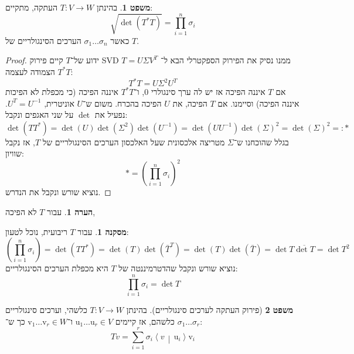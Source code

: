 \documentclass[a4paper]{article}
\newcommand\vrm   {\bm{\mathrm{v}}}
\newcommand\urm   {\bm{\mathrm{u}}}
\newcommand\ra    {\rangle}
\newcommand\la    {\langle}
\newcommand\co        {\colon}
\newcommand\mut [2]   {\left \la #1 \,\middle|\, #2 \right \ra}
\newcommand\sg        {\sigma}
\newcommand\Sg        {\Sigma}
\newcommand\op    {^{-1}}
\newcommand\cl [1]    {\left ( #1 \right )}
\theoremstyle{definition}
\newtheorem{Theorem}{\color{myblue}משפט}
\newtheorem{Remark}{\color{mycyan}הערה}
\newtheorem{Collary}{\color{mymagenta}מסקנה}
\newcommand\cola [1] {\begin{Collary}#1\end{Collary}}
\newcommand\theo  [1] {\begin{Theorem}#1\end{Theorem}}
\newcommand\rmark [1] {\begin{Remark}#1\end{Remark}}
\begin{document}
	\theo{בהינתן $T \co V \to W$ העתקה, מתקיים: 
	\[ \sqrt{\det(T^*T)} = \prod_{i = 1}^{n}\sg_i \]
	כאשר $\sg_1 \dots \sg_n$ הערכים הסינגולריים של $T$. 
	}
	\begin{proof}
		ידוע של־$T$ קיים פירוק SVD $T = U\Sg V^T$ ממנו נסיק את הפירוק הספקטרלי הבא ל־$T^*T$ הצמודה לעצמה:
		\[ T^*T = U\Sg^2U^T \]
		אם $T$ איננה הפיכה אז יש לה ערך סינגולרי $0$, ו־$T^*T$ איננה הפיכה (כי מכפלת לא הפיכות איננה הפיכה) וסיימנו. 
		אם $T$ הפיכה, את $U$ הפיכה בהכרח. משום ש־$U$ אוניטרית, $U^T = U\op$. נפעיל את $\det$ על שני האגפים ונקבל: 
		\[ \det(TT^*) = \det(U)\det(\Sg^2)\det(U\op) = \det(UU\op)\det(\Sg)^{2} = \det(\Sg)^2 =: * \]
		בגלל שהוכחנו ש־$\Sg$ מטריצה אלכסונית שעל האלכסון הערכים הסינגולריים של $T$, אז נקבל שוויון: 
		\[ * = \cl{\prod_{i = 1}^{n}\sg_i}^{2} \]
		נוציא שורש ונקבל את הנדרש. 
	\end{proof}
	\rmark{עבור $T$ לא הפיכה, }
	\cola{עבור $T$ ריבועית, נוכל לטעון: 
	\[ \cl{\prod_{i = 1}^{n}\sg_i} = \det(TT^*) = \det(T)\det(\bar T^T) = \det(T) \det (\bar T) = \det T \overline{\det T} = \det T^2 \]
	נוציא שורש ונקבל שהדטרמיננטה של $T$ היא מכפלת הערכים הסינגולריים: 
	\[ \prod_{i = 1}^{n} \sg_i = \det T \]}
	
	
	\begin{Theorem}[פירוק העתקה לערכים סינגולריים]
		בהינתן $T \co V \to W$ כלשהי, וערכים סינגולריים $\sg_1 \dots \sg_r$ כלשהם, אז קיימים $\urm_1 \dots \urm_r \in V$ ו־$\vrm_1 \dots \vrm_r \in W$ כך ש־: 
		\[ Tv = \sum_{i = 1}^{r}\sg_i \mut{v}{\urm_i}\vrm_i \]
	\end{Theorem}
	
\end{document}
